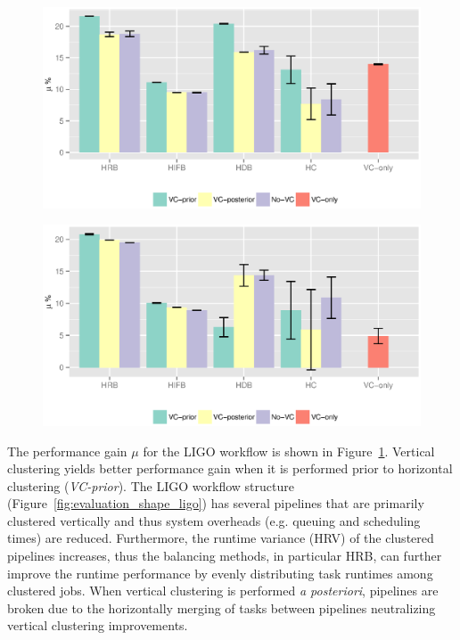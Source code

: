 \documentclass[final,5p,times,twocolumn]{elsarticle}
\begin{document}
\begin{figure}[!htb]
	\centering
	\includegraphics[width=1.0\linewidth]{figure26.eps}
	\label{fig:evaluation_vc_ligo}
\end{figure}


\begin{figure}[!htb]
	\centering
	\includegraphics[width=1.0\linewidth]{figure27.eps}
	\label{fig:evaluation_vc_genome}
\end{figure}

The performance gain $\mu$ for the LIGO workflow is shown in Figure~\ref{fig:evaluation_vc_ligo}. Vertical clustering yields better performance gain when it is performed prior to horizontal clustering (\emph{VC-prior}). The LIGO workflow structure (Figure~\ref{fig:evaluation_shape_ligo}) has several pipelines that are primarily clustered vertically and thus system overheads (e.g. queuing and scheduling times) are reduced. Furthermore, the runtime variance (HRV) of the clustered pipelines increases, thus the balancing methods, in particular HRB, can further improve the runtime performance by evenly distributing task runtimes among clustered jobs. When vertical clustering is performed \emph{a posteriori}, pipelines are broken due to the horizontally merging of tasks between pipelines neutralizing vertical clustering improvements.
\end{document}
